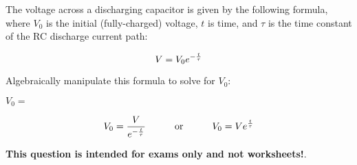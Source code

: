 

The voltage across a discharging capacitor is given by the following formula, where $V_0$ is the initial (fully-charged) voltage, $t$ is time, and $\tau$ is the time constant of the RC discharge current path:
 
$$V = V_0 e^{- {t \over \tau}}$$

Algebraically manipulate this formula to solve for $V_0$:

\vskip 20pt

$V_0 = $







$$V_0 = {V \over {e^{- {t \over \tau}}}} \hskip 30pt \hbox{or} \hskip 30pt V_0 = V e^{t \over \tau}$$







{\bf This question is intended for exams only and not worksheets!}.



